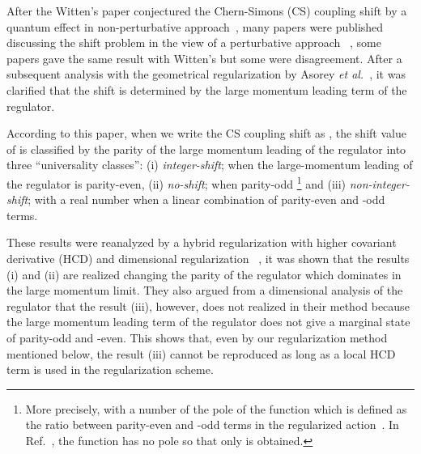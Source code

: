 \documentclass[a4paper,12pt]{article}
\begin{document}
After the Witten's paper
conjectured the Chern-Simons (CS) coupling shift
by a quantum effect in non-perturbative approach~\cite{Witten:1989hf},
many papers were published discussing the shift problem
in the view of a perturbative approach%
~\cite{Alvarez-Gaume:1990wk,Korchemsky:1990va,Martin:1990xv,Asorey:1990rn,
       Birmingham:1990ut,Giavarini:1993xb},
some papers gave the same result with Witten's but some were disagreement.
%
After a subsequent analysis with the geometrical regularization
by Asorey \textit{et al.}~\cite{Asorey:1994em},
it was clarified that
the shift is determined by the large momentum leading term of the regulator.

According to this paper, %
when we write the CS coupling shift as
\myHighlight{$\theta\rightarrow\theta + \alpha$}\coordHE{},
the shift value of \myHighlight{$\alpha$}\coordHE{} is classified
by the parity of the large momentum leading of the regulator
into three ``universality classes'':
%
(i) \textit{integer-shift}; \coordHE{} when the large-momentum leading of the regulator is parity-even,
(ii) \textit{no-shift}; \coordHE{} when parity-odd%
\footnote{More precisely, \coordHE{}
          with \coordHE{} a number of the pole of the function \coordHE{}
          which is defined as the ratio between parity-even
          and -odd terms in the regularized action~\cite{Asorey:1994em}.
          In Ref.~\cite{Nittoh:1998ey},
          the function \coordHE{} has no pole
          so that only \coordHE{} is obtained.
          }
and
(iii) \textit{non-integer-shift}; \coordHE{} with a real number \coordHE{}
when a linear combination of parity-even and -odd terms.


These results were reanalyzed by a hybrid regularization with
higher covariant derivative (HCD) and dimensional regularization%
~\cite{Giavarini:1994zh},
it was shown that the results (i) and (ii) are realized
changing the parity of the regulator
which dominates in the large momentum limit.
%
They also argued from a dimensional analysis of the regulator
that the result (iii), however, does not realized in their method
because the large momentum leading term of the regulator
does not give a marginal state of parity-odd and -even.
%
This shows that,
even by our regularization method mentioned below,
the result (iii) cannot be reproduced 
as long as a local HCD term is used in the regularization scheme.
\end{document}
